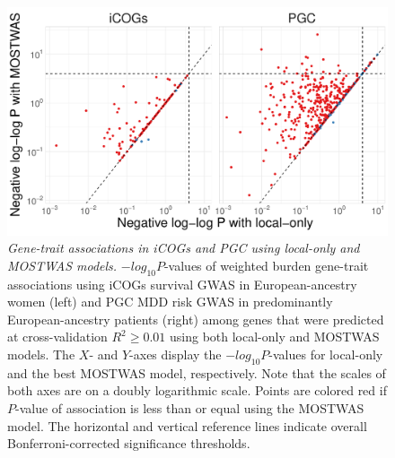 \documentclass[11pt]{article}
\begin{document}
\begin{center}
\begin{figure}[!h]
    \includegraphics[width=\textwidth]{figures/ch4_suppfig2.pdf}
    \caption{\emph{Gene-trait associations in iCOGs
    and PGC using local-only and MOSTWAS models.} $-log_{10} P$-values of weighted
    burden gene-trait associations
    using iCOGs survival GWAS in European-ancestry
    women (left) and PGC MDD risk
    GWAS in predominantly 
    European-ancestry patients (right) 
    among genes that were predicted at cross-validation
    $R^2 \geq 0.01$ using both local-only
    and MOSTWAS models. The $X$- and $Y$-axes display
    the $-log_{10} P$-values for local-only
    and the best MOSTWAS model, respectively. Note
    that the scales of both axes are on a doubly logarithmic scale.
    Points are colored red if $P$-value
    of association is less than
    or equal using the MOSTWAS
    model. The horizontal and vertical reference lines indicate
    overall Bonferroni-corrected
    significance thresholds.}
    \label{fig:ch4_suppfig2}
\end{figure}
\end{center}

\pagebreak
\end{document}
